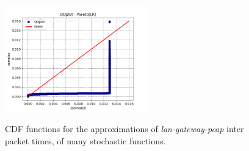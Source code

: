 \begin{figure}[ht!]
{		\includegraphics[width=62mm]{figures/apC/qq/bigFlows_QQplot_-_Pareto(LR)}
	}
	\hspace{0mm}
	\caption{CDF functions for the approximations of \textit{lan-gateway-pcap} inter  packet times, of many stochastic functions.}
\end{figure}

\clearpage

